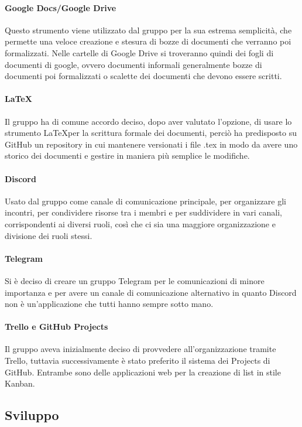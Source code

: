 \documentclass[../norme_di_progetto.tex]{subfiles}
\begin{document}
\paragraph{Google Docs/Google Drive}
Questo strumento viene utilizzato dal gruppo per la sua estrema semplicità, che permette una veloce creazione e stesura di bozze di documenti che verranno poi formalizzati. Nelle cartelle di Google Drive si troveranno quindi dei fogli di documenti di google, ovvero documenti informali generalmente bozze di documenti poi formalizzati o scalette dei documenti che devono essere scritti.

\paragraph{\LaTeX}
Il gruppo ha di comune accordo deciso, dopo aver valutato l'opzione, di usare lo strumento \LaTeX per la scrittura formale dei documenti, perciò ha predisposto su GitHub un repository in cui mantenere versionati i file .tex in modo da avere uno storico dei documenti e gestire in maniera più semplice le modifiche.

\paragraph{Discord}
Usato dal gruppo come canale di comunicazione principale, per organizzare gli incontri, per condividere risorse tra i membri e per suddividere in vari canali, corrispondenti ai diversi ruoli, così che ci sia una maggiore organizzazione e divisione dei ruoli stessi.

\paragraph{Telegram}
Si è deciso di creare un gruppo Telegram per le comunicazioni di minore importanza e per avere un canale di comunicazione alternativo in quanto Discord non è un'applicazione che tutti hanno sempre sotto mano.

\paragraph{Trello e GitHub Projects}
Il gruppo aveva inizialmente deciso di provvedere all'organizzazione tramite Trello, tuttavia successivamente è stato preferito il sistema dei Projects di GitHub. Entrambe sono delle applicazioni web per la creazione di list in stile Kanban.

\subsection{Sviluppo}
\end{document}
